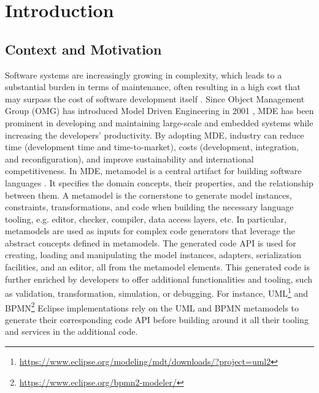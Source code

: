 \chapter{Introduction}



\section{Context and Motivation}
Software systems are increasingly growing in complexity, which leads to a substantial burden in terms of maintenance, often resulting in a high cost that may surpass the cost of software development itself \cite{https://doi.org/10.1049/sfw2.12075}.
Since Object Management Group (OMG) has introduced Model Driven Engineering in 2001 \cite{brambilla2017model}, MDE has been prominent in developing and maintaining large-scale and embedded systems while increasing the developers' productivity. By adopting MDE, industry can reduce time (development time and time-to-market), costs (development, integration, and reconfiguration), and improve sustainability and international competitiveness. %
 In MDE, metamodel is a central artifact for building software languages \cite{cabot2012object}. It specifies the domain concepts, their properties, and the relationship between them.
A metamodel is the cornerstone to generate model instances, constraints, transformations, and code when building the necessary language tooling, e.g. editor, checker, compiler, data access layers, etc. 
In particular, metamodels are used as inputs for complex code generators that leverage the abstract concepts defined in metamodels. The generated code API is used for creating, loading and manipulating the model instances, adapters, serialization facilities, and an editor, all from the metamodel elements.
This generated code is further enriched by developers to offer additional functionalities and tooling, such as validation, transformation, simulation, or debugging.
For instance, UML\footnote{\url{https://www.eclipse.org/modeling/mdt/downloads/?project=uml2}}  and BPMN\footnote{\url{https://www.eclipse.org/bpmn2-modeler/}} Eclipse implementations rely on the UML and BPMN metamodels to generate their corresponding code API before building around it all their tooling and services in the additional code.
